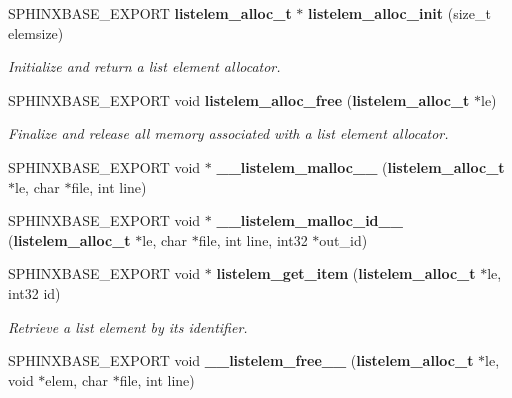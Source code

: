 \begin{DoxyCompactItemize}
\item 
\-S\-P\-H\-I\-N\-X\-B\-A\-S\-E\-\_\-\-E\-X\-P\-O\-R\-T \*
{\bf listelem\-\_\-alloc\-\_\-t} $\ast$ {\bf listelem\-\_\-alloc\-\_\-init} (size\-\_\-t elemsize)\label{listelem__alloc_8h_a4b08b49eaa74cbe9a3c95170cee78de7}

\begin{DoxyCompactList}\small\item\em \-Initialize and return a list element allocator. \end{DoxyCompactList}\item 
\-S\-P\-H\-I\-N\-X\-B\-A\-S\-E\-\_\-\-E\-X\-P\-O\-R\-T void {\bf listelem\-\_\-alloc\-\_\-free} ({\bf listelem\-\_\-alloc\-\_\-t} $\ast$le)\label{listelem__alloc_8h_a94c02e93a0abaa2bd79636cbac6cced2}

\begin{DoxyCompactList}\small\item\em \-Finalize and release all memory associated with a list element allocator. \end{DoxyCompactList}\item 
\-S\-P\-H\-I\-N\-X\-B\-A\-S\-E\-\_\-\-E\-X\-P\-O\-R\-T void $\ast$ {\bfseries \-\_\-\-\_\-listelem\-\_\-malloc\-\_\-\-\_\-} ({\bf listelem\-\_\-alloc\-\_\-t} $\ast$le, char $\ast$file, int line)\label{listelem__alloc_8h_a04e5512f4dcedc2e84e58108bf61f1ff}

\item 
\-S\-P\-H\-I\-N\-X\-B\-A\-S\-E\-\_\-\-E\-X\-P\-O\-R\-T void $\ast$ {\bfseries \-\_\-\-\_\-listelem\-\_\-malloc\-\_\-id\-\_\-\-\_\-} ({\bf listelem\-\_\-alloc\-\_\-t} $\ast$le, char $\ast$file, int line, int32 $\ast$out\-\_\-id)\label{listelem__alloc_8h_a45f35edbe5f23773b1624f2ca2ac5e86}

\item 
\-S\-P\-H\-I\-N\-X\-B\-A\-S\-E\-\_\-\-E\-X\-P\-O\-R\-T void $\ast$ {\bf listelem\-\_\-get\-\_\-item} ({\bf listelem\-\_\-alloc\-\_\-t} $\ast$le, int32 id)\label{listelem__alloc_8h_a74e610ac90e2b0696b2aedef4289d8f3}

\begin{DoxyCompactList}\small\item\em \-Retrieve a list element by its identifier. \end{DoxyCompactList}\item 
\-S\-P\-H\-I\-N\-X\-B\-A\-S\-E\-\_\-\-E\-X\-P\-O\-R\-T void {\bf \-\_\-\-\_\-listelem\-\_\-free\-\_\-\-\_\-} ({\bf listelem\-\_\-alloc\-\_\-t} $\ast$le, void $\ast$elem, char $\ast$file, int line)\label{listelem__alloc_8h_ab83a7a6fd086c14140ad2c8c4162709b}


\end{DoxyCompactItemize}
